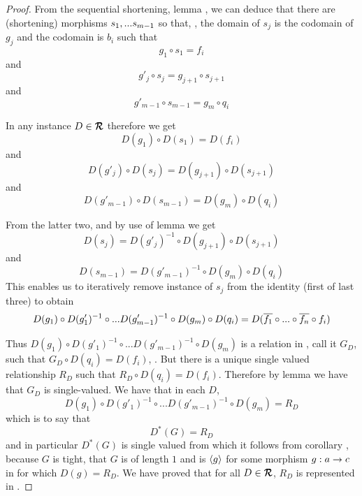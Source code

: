 \begin{proof}
From the sequential shortening, 
lemma ,
 we can deduce that there are
(shortening) morphisms $\sm[-1]$ so that, \foreachj[m-2],
the domain of  $s_j$ is the codomain of $g_j$ and 
the codomain  is $b_i$ such that 
\[
g_1 \circ s_1 = f_i
\]
and \foreachj[m-1]
\[
g'_j \circ s_j = g_{j+1} \circ s_{j+1}
\]
and
\[
g'_{m-1} \circ s_{m-1} = g_m \circ q_i
\] 

In any instance $D \in \reqtc$ therefore we get
\[
D(g_1) \circ D(s_1) = D(f_i)
\]
and \foreachj[m-2]
\[
D(g'_j) \circ D(s_j) = D(g_{j+1}) \circ D(s_{j+1})
\]
and
\[
D(g'_{m-1}) \circ D(s_{m-1}) = D(g_m) \circ D(q_i)
\]

From the latter two, and by use of  lemma  we get
\[
D(s_j) = D(g'_j)^{-1} \circ D(g_{j+1}) \circ D(s_{j+1})
\]
and
\[
 D(s_{m-1}) = D(g'_{m-1})^{-1} \circ D(g_m) \circ D(q_i)
\]
This enables us to iteratively remove instance of $s_j$ from the identity (first of last three)
to obtain 
\[
D(g_1) \circ D(g'_1)^{-1} \circ ... 
D(g'_{m-1})^{-1} \circ D(g_m)  \circ D(q_i)
= D(\restrictToSource{f}{n} \circ f_i)
\]

Thus $D(g_1) \circ D(g'_1)^{-1} \circ ... D(g'_{m-1})^{-1} \circ D(g_m)$
is a relation in \Rel , call it $G_D$, such that $G_D \circ D(q_i) = D(f_i)$, \foreachi. 
But there is a unique single valued relationship $R_D$
such that  $R_D \circ D(q_i) = D(f_i)$. 
Therefore by lemma  we have that $G_D$ is single-valued. We have that in each $D$,
\[
D(g_1) \circ D(g'_1)^{-1} \circ ... D(g'_{m-1})^{-1} \circ D(g_m) = R_D
\]
which is to say that
\[
D^*(G)=R_D
\]
and in particular $D^*(G)$ is single valued from which it follows from corollary  
, because $G$ is tight, that $G$ is of length $1$ and
is $\tuple{g}$ 
for some morphism $g:a \morph c$ in \catcw
for which $D(g)=R_D$. We have proved that 
for all $D \in \reqt$, $R_D$ is represented in \catc. 

\end{proof}

